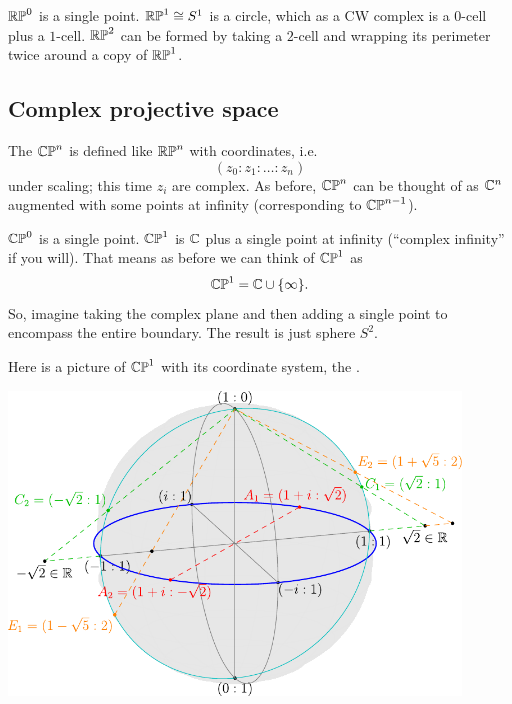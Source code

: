 \begin{example}
	\listhack
	\begin{enumerate}[(a)]
		\ii $\mathbb{RP}^0$ is a single point.
		\ii $\mathbb{RP}^1 \cong S^1$ is a circle, which as a CW complex
		is a $0$-cell plus a $1$-cell.
		\ii $\mathbb{RP}^2$ can be formed by taking a $2$-cell
		and wrapping its perimeter twice around a copy of $\mathbb{RP}^1$.
	\end{enumerate}
\end{example}

\subsection{Complex projective space}
The  $\mathbb{CP}^n$ is
defined like $\mathbb{RP}^n$ with coordinates, i.e.\
\[ (z_0 : z_1 : \dots : z_n) \]
under scaling; this time $z_i$ are complex.
As before, $\mathbb{CP}^n$ can be thought of as $\mathbb C^n$ augmented
with some points at infinity (corresponding to $\mathbb{CP}^{n-1}$).
\begin{example}
	\listhack
	\begin{enumerate}[(a)]
		\ii $\mathbb{CP}^0$ is a single point.
		\ii $\mathbb{CP}^1$ is $\mathbb C$ plus a single point at infinity
		(``complex infinity'' if you will).
		That means as before we can think of $\mathbb{CP}^1$ as
		\[ \mathbb{CP}^1 = \mathbb C \cup \{\infty\}. \]
		So, imagine taking the complex plane and then adding
		a single point to encompass the entire boundary.
		The result is just sphere $S^2$.
	\end{enumerate}
	Here is a picture of $\mathbb{CP}^1$ with its coordinate system,
	the .
	\begin{center}
		\includegraphics[width=0.9\textwidth]{media/earth.pdf}
	\end{center}
\end{example}

